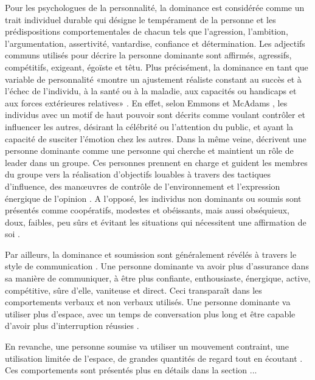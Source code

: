 Pour les psychologues de la personnalité, la dominance est considérée comme un trait individuel durable qui désigne le tempérament de la personne et les prédispositions comportementales de chacun \cite{cattell1970handbook,ridgeway1987nonverbal} tels que l'agression, l'ambition, l'argumentation,
assertivité, vantardise, confiance et détermination.
Les adjectifs communs utilisés pour décrire la personne dominante sont affirmés, agressifs, compétitifs, exigeant, égoïste et têtu. Plus précisément, la dominance en tant que variable de personnalité «montre un ajustement réaliste constant au succès et à l'échec de l'individu, à la santé ou à la maladie, aux capacités ou handicaps et aux forces extérieures relatives» \cite{cattell1970handbook,burgoon1998nature}.
En effet, selon  Emmons et McAdams \cite{emmons1991personal}, les individus avec un motif de haut pouvoir sont décrits comme voulant contrôler et influencer les autres, désirant la célébrité ou l'attention du public, et ayant la capacité de susciter l'émotion chez les autres. Dans la même veine, \cite{jackson1974personality} décrivent une personne dominante comme une personne qui cherche et maintient un rôle de leader dans un groupe. Ces personnes prennent en charge et guident les membres du groupe vers la réalisation d'objectifs louables à travers des tactiques d'influence, des manœuvres de contrôle de l'environnement et l'expression énergique de l'opinion \cite{burgoon1998nature}. 
A l'opposé, les individus non dominants ou soumis sont présentés comme coopératifs, modestes et obéissants, mais aussi obséquieux, doux, faibles, peu sûrs et évitant les situations qui nécessitent une affirmation de soi \cite{burgoon1998nature}. 

Par ailleurs, la dominance et soumission sont généralement révélés à travers le style de communication \cite{burgoon1998nature}. Une personne dominante va avoir plus d'assurance dans sa manière de communiquer, à être plus confiante, enthousiaste, énergique, active, compétitive, sûre d'elle, vaniteuse et direct. Ceci transparaît dans les comportements verbaux et non verbaux utilisés. Une personne dominante va  utiliser plus d'espace, avec un temps de conversation plus long et être capable d'avoir plus d'interruption réussies \cite{burgoon1998nature}. 

En revanche, une personne soumise va utiliser un mouvement contraint, une utilisation limitée de l'espace, de grandes quantités de regard tout en écoutant  \cite{burgoon1998nature}. Ces comportements sont présentés plus en détails dans la section ... 


